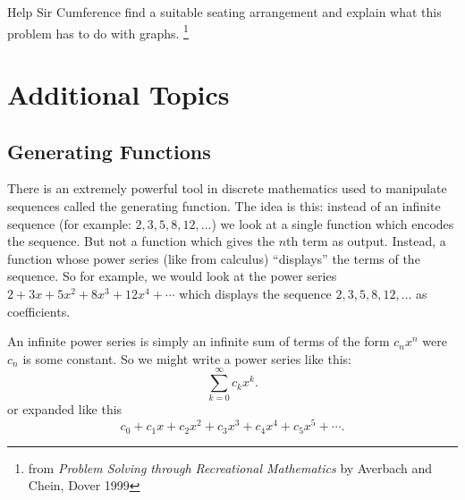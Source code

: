 \documentclass[10pt,]{book}
\theoremstyle{plain}
\theoremstyle{definition}
\theoremstyle{definition}
\theoremstyle{definition}
\numberwithin{equation}{chapter}
\begin{document}
\begin{exerciselist}
            Help Sir Cumference find a suitable seating arrangement and explain what this problem has to do with graphs.
            \footnote{from \emph{Problem Solving through Recreational Mathematics} by Averbach and Chein, Dover 1999\label{fn-19}}
\par\smallskip
\end{exerciselist}
\typeout{************************************************}
\typeout{************************************************}
\chapter[Additional Topics]{Additional Topics}\label{ch_additionalTopics}
\typeout{************************************************}
\typeout{************************************************}
\section[Generating Functions]{Generating Functions}\label{section-29}
\typeout{************************************************}
\typeout{************************************************}

There is an extremely powerful tool in discrete mathematics used to manipulate sequences called the generating function. The idea is this: instead of an infinite sequence (for example: \(2, 3, 5, 8, 12, \ldots\)) we look at a single function which encodes the sequence. But not a function which gives the \(n\)th term as output. Instead, a function whose power series (like from calculus) ``displays'' the terms of the sequence. So for example, we would look at the power series \(2 + 3x + 5x^2 + 8x^3 + 12x^4 + \cdots\) which displays the sequence \(2, 3, 5, 8, 12, \ldots\) as coefficients.
%
\par

An infinite power series is simply an infinite sum of terms of the form \(c_nx^n\) were \(c_n\) is some constant. So we might write a power series like this:
\begin{equation*}
  \sum_{k=0}^\infty c_k x^k.
\end{equation*}
or expanded like this
\begin{equation*}
  c_0 + c_1x + c_2x^2 + c_3x^3 + c_4x^4 + c_5x^5 + \cdots.
\end{equation*}
%
\par
\end{document}

